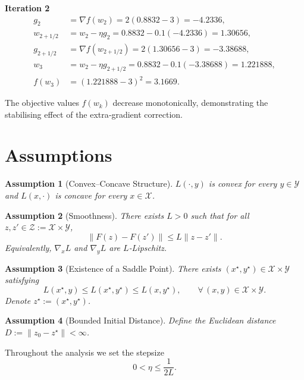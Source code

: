 \documentclass[11pt]{article}
\newtheorem{assumption}{Assumption}[section]
\begin{document}
\noindent\textbf{Iteration 2}
\[
\begin{aligned}
g_2 &=\nabla f(w_2)=2(0.8832-3)=-4.2336,\\
w_{2+1/2}&=w_2-\eta g_2=0.8832-0.1(-4.2336)=1.30656,\\
g_{2+1/2}&=\nabla f(w_{2+1/2})=2(1.30656-3)=-3.38688,\\
w_{3}&=w_2-\eta g_{2+1/2}=0.8832-0.1(-3.38688)=1.221888,\\
f(w_3)&=(1.221888-3)^2=3.1669.
\end{aligned}
\]

The objective values $f(w_k)$ decrease monotonically, demonstrating the stabilising effect of the extra‑gradient correction.

\newpage

\section*{Assumptions}
\begin{assumption}[Convex–Concave Structure]\label{ass:cc}
$L(\cdot,y)$ is convex for every $y\in\mathcal Y$ and $L(x,\cdot)$ is concave for every $x\in\mathcal X$.
\end{assumption}

\begin{assumption}[Smoothness]\label{ass:smooth}
There exists $L>0$ such that for all $z,z'\in\mathcal Z:=\mathcal X\times\mathcal Y$,
\[
\|F(z)-F(z')\|\le L\|z-z'\|.
\tag{A2}
\]
Equivalently, $\nabla_x L$ and $\nabla_y L$ are $L$‑Lipschitz.
\end{assumption}

\begin{assumption}[Existence of a Saddle Point]\label{ass:exist}
There exists $(x^\star,y^\star)\in\mathcal X\times\mathcal Y$ satisfying
\[
L(x^\star,y)\le L(x^\star,y^\star)\le L(x,y^\star),\qquad\forall\,(x,y)\in\mathcal X\times\mathcal Y .
\tag{A3}
\]
Denote $z^\star:=(x^\star,y^\star)$.
\end{assumption}

\begin{assumption}[Bounded Initial Distance]\label{ass:bound}
Define the Euclidean distance $D:=\|z_0-z^\star\|<\infty$.
\end{assumption}

Throughout the analysis we set the stepsize
\[
0<\eta\le \frac{1}{2L}.
\tag{A4}
\]

\newpage

\end{document}
